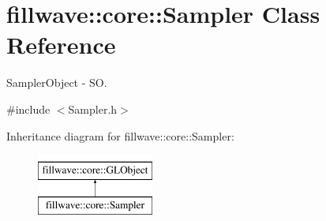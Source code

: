 \hypertarget{classfillwave_1_1core_1_1Sampler}{}\section{fillwave\+:\+:core\+:\+:Sampler Class Reference}
\label{classfillwave_1_1core_1_1Sampler}


Sampler\+Object -\/ S\+O.  




{\ttfamily \#include $<$Sampler.\+h$>$}

Inheritance diagram for fillwave\+:\+:core\+:\+:Sampler\+:\begin{figure}[H]
\begin{center}
\leavevmode
\includegraphics[height=2.000000cm]{classfillwave_1_1core_1_1Sampler}
\end{center}
\end{figure}
